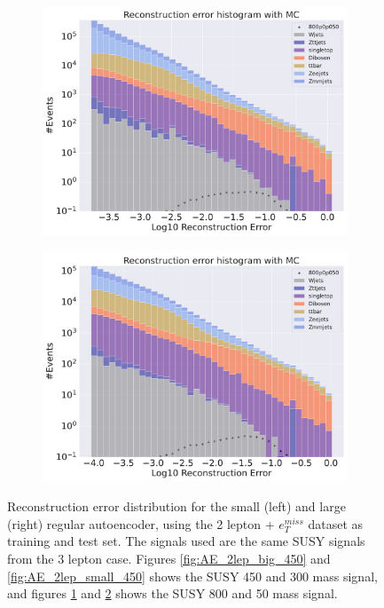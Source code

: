\begin{figure}[H]
\begin{subfigure}{.45\textwidth}
        \includegraphics[width=\textwidth]{Figures/AE_testing/big/2lep/b_data_recon_big_rm3_feats_sig_800p0p050_.pdf}
        \caption{}
        \label{fig:AE_2lep_big_800}
    \end{subfigure}
    \hfill   
    \begin{subfigure}{.45\textwidth}
        \includegraphics[width=\textwidth]{Figures/AE_testing/small/2lep/b_data_recon_big_rm3_feats_sig_800p0p050_.pdf}
        \caption{}
        \label{fig:AE_2lep_small_800}
    \end{subfigure}
    \hfill      
    \caption[2lep reconstruction error with SUSY signals for AE]{Reconstruction error distribution for the small (left) and large (right)
    regular autoencoder, using the 2 lepton + $e_T^{miss}$ dataset as training and test set. The signals used are the same SUSY signals 
    from the 3 lepton case. Figures \ref{fig:AE_2lep_big_450} and \ref{fig:AE_2lep_small_450} shows the SUSY 450 and 300 mass signal, 
    and figures \ref{fig:AE_2lep_big_800} and \ref{fig:AE_2lep_small_800} shows the SUSY 800 and 50 mass signal.}
    \label{fig:AE_2lep_recon_err_both_sig}
\end{figure}

